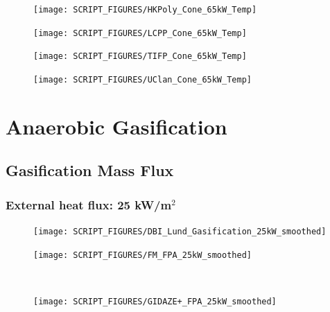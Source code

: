 \documentclass{book}
\begin{document}
\begin{landscape}
\vfill

\begin{minipage}{0.65\textwidth}
\begin{figure}[H]
{\texttt{[image: SCRIPT\_FIGURES/HKPoly\_Cone\_65kW\_Temp]}}\\
\end{figure}
\end{minipage}
\begin{minipage}{0.35\textwidth}
\begin{figure}[H]
{\texttt{[image: SCRIPT\_FIGURES/LCPP\_Cone\_65kW\_Temp]}}\\
\end{figure}
\end{minipage}

\begin{minipage}{0.65\textwidth}
\begin{figure}[H]
{\texttt{[image: SCRIPT\_FIGURES/TIFP\_Cone\_65kW\_Temp]}}\\
\end{figure}
\end{minipage}
\begin{minipage}{0.35\textwidth}
\begin{figure}[H]
{\texttt{[image: SCRIPT\_FIGURES/UClan\_Cone\_65kW\_Temp]}}\\
\end{figure}
\end{minipage}
\vfill

\chapter{Anaerobic Gasification}
\section{Gasification Mass Flux}
\label{Gas_Mass}
\subsection{External heat flux: 25 kW/m$^2$}
\begin{minipage}{0.65\textwidth}
\begin{figure}[H]
{\texttt{[image: SCRIPT\_FIGURES/DBI\_Lund\_Gasification\_25kW\_smoothed]}}\\
\end{figure}
\end{minipage}
\begin{minipage}{0.35\textwidth}
\begin{figure}[H]
{\texttt{[image: SCRIPT\_FIGURES/FM\_FPA\_25kW\_smoothed]}}\\
\end{figure}
\end{minipage}\\
\begin{minipage}{0.65\textwidth}
\begin{figure}[H]
{\texttt{[image: SCRIPT\_FIGURES/GIDAZE+\_FPA\_25kW\_smoothed]}}\\
\end{figure}
\end{minipage}
\vfill


\end{landscape}
\end{document}

